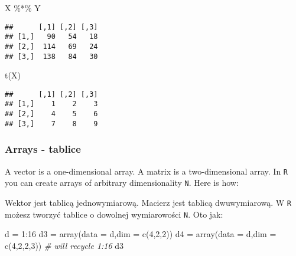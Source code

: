 \documentclass[
]{article}
\newenvironment{Shaded}{\begin{snugshade}}{\end{snugshade}}
\newcommand{\AttributeTok}[1]{\textcolor[rgb]{0.77,0.63,0.00}{#1}}
\newcommand{\CommentTok}[1]{\textcolor[rgb]{0.56,0.35,0.01}{\textit{#1}}}
\newcommand{\DecValTok}[1]{\textcolor[rgb]{0.00,0.00,0.81}{#1}}
\newcommand{\FunctionTok}[1]{\textcolor[rgb]{0.00,0.00,0.00}{#1}}
\newcommand{\NormalTok}[1]{#1}
\newcommand{\OtherTok}[1]{\textcolor[rgb]{0.56,0.35,0.01}{#1}}
\newcommand{\SpecialCharTok}[1]{\textcolor[rgb]{0.00,0.00,0.00}{#1}}
\begin{document}
\begin{Shaded}
\begin{Highlighting}[]
\NormalTok{X }\SpecialCharTok{\%*\%}\NormalTok{ Y}
\end{Highlighting}
\end{Shaded}

\begin{verbatim}
##      [,1] [,2] [,3]
## [1,]   90   54   18
## [2,]  114   69   24
## [3,]  138   84   30
\end{verbatim}

\begin{Shaded}
\begin{Highlighting}[]
\FunctionTok{t}\NormalTok{(X)}
\end{Highlighting}
\end{Shaded}

\begin{verbatim}
##      [,1] [,2] [,3]
## [1,]    1    2    3
## [2,]    4    5    6
## [3,]    7    8    9
\end{verbatim}

\hypertarget{arrays---tablice}{%
\subsubsection{Arrays - tablice}\label{arrays---tablice}}

A vector is a one-dimensional array. A matrix is a two-dimensional
array. In \texttt{R} you can create arrays of arbitrary dimensionality
\texttt{N}. Here is how:

Wektor jest tablicą jednowymiarową. Macierz jest tablicą dwuwymiarową. W
\texttt{R} możesz tworzyć tablice o dowolnej wymiarowości \texttt{N}.
Oto jak:

\begin{Shaded}
\begin{Highlighting}[]
\NormalTok{d }\OtherTok{=} \DecValTok{1}\SpecialCharTok{:}\DecValTok{16}
\NormalTok{d3 }\OtherTok{=} \FunctionTok{array}\NormalTok{(}\AttributeTok{data =}\NormalTok{ d,}\AttributeTok{dim =} \FunctionTok{c}\NormalTok{(}\DecValTok{4}\NormalTok{,}\DecValTok{2}\NormalTok{,}\DecValTok{2}\NormalTok{))}
\NormalTok{d4 }\OtherTok{=} \FunctionTok{array}\NormalTok{(}\AttributeTok{data =}\NormalTok{ d,}\AttributeTok{dim =} \FunctionTok{c}\NormalTok{(}\DecValTok{4}\NormalTok{,}\DecValTok{2}\NormalTok{,}\DecValTok{2}\NormalTok{,}\DecValTok{3}\NormalTok{))  }\CommentTok{\# will recycle 1:16}
\NormalTok{d3}
\end{Highlighting}
\end{Shaded}
\end{document}
